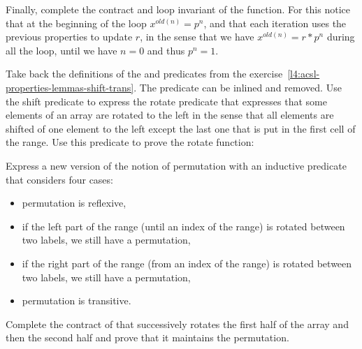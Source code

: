 Finally, complete the contract and loop invariant of the 
function. For this notice that at the beginning of the loop $x^{old(n)} = p^n$,
and that each iteration uses the previous properties to update $r$, in the sense
that we have $x^{old(n)} = r * p^n$ during all the loop, until we have $n = 0$ and
thus $p^n = 1$.




Take back the definitions of the  and 
predicates from the exercise~\ref{l4:acsl-properties-lemmas-shift-trans}. The
 predicate can be inlined and removed. Use the
shift predicate to express the rotate predicate that expresses that some elements
of an array are rotated to the left in the sense that all elements are shifted of
one element to the left except the last one that is put in the first cell of the
range. Use this predicate to prove the rotate function:




Express a new version of the notion of permutation with an inductive predicate
that considers four cases:

\begin{itemize}
\item permutation is reflexive,
\item if the left part of the range (until an index of the range) is rotated
  between two labels, we still have a permutation,
\item if the right part of the range (from an index of the range) is rotated
  between two labels, we still have a permutation,
\item permutation is transitive.
\end{itemize}




Complete the contract of  that successively rotates the
first half of the array and then the second half and prove that it maintains the
permutation.


